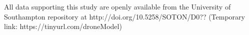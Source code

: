 \documentclass[runningheads,a4paper]{llncs}
\begin{document}
\vspace{6 pt}
\begin{scriptsize}

	\par
	\noindent
	All data supporting this study are openly available from the University of Southampton repository at
	http://doi.org/10.5258/SOTON/D0?? (Temporary link: https://tinyurl.com/droneModel)\\


\end{scriptsize}




\end{document}
